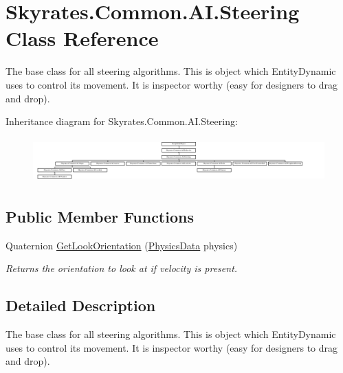 \hypertarget{class_skyrates_1_1_common_1_1_a_i_1_1_steering}{\section{Skyrates.\-Common.\-A\-I.\-Steering Class Reference}
\label{class_skyrates_1_1_common_1_1_a_i_1_1_steering}
}


The base class for all steering algorithms. This is object which Entity\-Dynamic uses to control its movement. It is inspector worthy (easy for designers to drag and drop).  


Inheritance diagram for Skyrates.\-Common.\-A\-I.\-Steering\-:\begin{figure}[H]
\begin{center}
\leavevmode
\includegraphics[height=1.750000cm]{class_skyrates_1_1_common_1_1_a_i_1_1_steering}
\end{center}
\end{figure}
\subsection*{Public Member Functions}
\begin{DoxyCompactItemize}
\item 
Quaternion \hyperlink{class_skyrates_1_1_common_1_1_a_i_1_1_steering_a02f18e51c00d42e95e328020d3203c31}{Get\-Look\-Orientation} (\hyperlink{class_skyrates_1_1_common_1_1_a_i_1_1_physics_data}{Physics\-Data} physics)
\begin{DoxyCompactList}\small\item\em Returns the orientation to look at if velocity is present. \end{DoxyCompactList}\end{DoxyCompactItemize}


\subsection{Detailed Description}
The base class for all steering algorithms. This is object which Entity\-Dynamic uses to control its movement. It is inspector worthy (easy for designers to drag and drop). 



